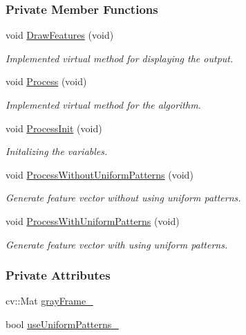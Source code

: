 \subsubsection*{Private Member Functions}
\begin{DoxyCompactItemize}
\item 
void \hyperlink{group___feature_extractor_a152c1785ca51eb7e5878c0d3f9309697}{Draw\-Features} (void)
\begin{DoxyCompactList}\small\item\em Implemented virtual method for displaying the output. \end{DoxyCompactList}\item 
void \hyperlink{group___feature_extractor_af664c189044d32f2cb71b334deb6f0c7}{Process} (void)
\begin{DoxyCompactList}\small\item\em Implemented virtual method for the algorithm. \end{DoxyCompactList}\item 
void \hyperlink{group___feature_extractor_a773b1c3fd663f58b01f1ba33a897744f}{Process\-Init} (void)
\begin{DoxyCompactList}\small\item\em Initalizing the variables. \end{DoxyCompactList}\item 
void \hyperlink{group___feature_extractor_a96e42213e77e729c263236db12453bde}{Process\-Without\-Uniform\-Patterns} (void)
\begin{DoxyCompactList}\small\item\em Generate feature vector without using uniform patterns. \end{DoxyCompactList}\item 
void \hyperlink{group___feature_extractor_aa29955bd43f95dcac63aa7840fcd1925}{Process\-With\-Uniform\-Patterns} (void)
\begin{DoxyCompactList}\small\item\em Generate feature vector with using uniform patterns. \end{DoxyCompactList}\end{DoxyCompactItemize}
\subsubsection*{Private Attributes}
\begin{DoxyCompactItemize}
\item 
cv\-::\-Mat \hyperlink{group___feature_extractor_ab2bdc329e16e4126eccbbe4b8d4d44f5}{gray\-Frame\-\_\-}
\item 
bool \hyperlink{group___feature_extractor_a6025f411377d4b6e56aa9eb5daff07e8}{use\-Uniform\-Patterns\-\_\-}
\end{DoxyCompactItemize}


